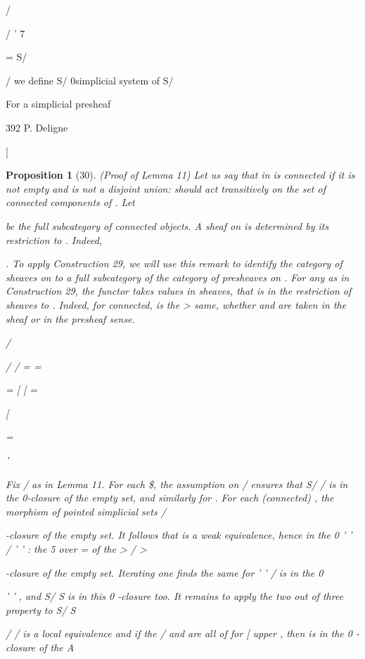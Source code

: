 \documentclass[11pt,a4paper]{article}
\theoremstyle{plain}
\newtheorem{proposition}[theorem]{Proposition}
\theoremstyle{definition}
\begin{document}
/

/ ' 7

 = S/ 

/ we define
S/  0simplicial system of S/ 

For a simplicial presheaf

392
P. Deligne


[

\begin{proposition}[30]
(Proof of Lemma 11) Let us say that
in
is connected
if it is not empty and is not a disjoint union: should act transitively on the set
of connected components of . Let

be the full subcategory of connected objects. A sheaf on
is determined by its restriction to . Indeed,

 . To apply Construction 29, we will use this remark to identify
the category of sheaves on
to a full subcategory of the category of presheaves
on . For any
as in Construction 29, the functor takes values in sheaves, that
is in the restriction of sheaves to . Indeed, for connected,
is the
>
same, whether and are taken in the sheaf or in the presheaf sense.

/

/    / 
=
=

 =
[
[
=

[

=

'





 

Fix  /
as in Lemma 11. For each \$, the assumption on / ensures that
S/ / is in the 0-closure of the empty set, and similarly for .
For each (connected)  , the morphism of pointed simplicial sets /

 -closure of the empty set. It follows that
is a weak equivalence, hence in the 0
' ' /  ' '  : the 5 over = of the
 >  /  > 

 -closure of the empty set. Iterating one finds the same for ' ' / 
is in the 0

' '   , and S/  S  is in this 0 -closure too. It remains to apply the two
out of three property to
S/   S 







/ 
 /
is a local equivalence and if the / and  are all of
 for [ upper
 , then  is in the 0 -closure of the  A 

\end{proposition}
\end{document}

